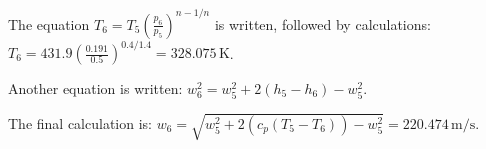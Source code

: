 The equation \( T_6 = T_5 \left( \frac{p_6}{p_5} \right)^{n-1/n} \) is written, followed by calculations:  
\( T_6 = 431.9 \left( \frac{0.191}{0.5} \right)^{0.4/1.4} = 328.075 \, \text{K} \).  

Another equation is written:  
\( w_6^2 = w_5^2 + 2 (h_5 - h_6) - w_5^2 \).  

The final calculation is:  
\( w_6 = \sqrt{w_5^2 + 2 (c_p (T_5 - T_6)) - w_5^2} = 220.474 \, \text{m/s} \).